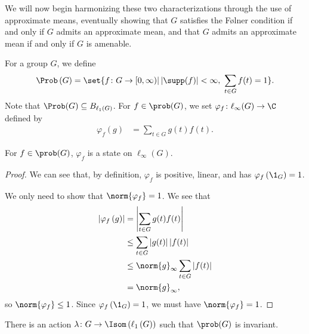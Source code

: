 We will now begin harmonizing these two characterizations through the use of approximate means, eventually showing that $G$ satisfies the Følner condition if and only if $G$ admits an approximate mean, and that $G$ admits an approximate mean if and only if $G$ is amenable.
\begin{definition}\label{def:state_on_prob_g}
  For a group $G$, we define
  \begin{align*}
    \Prob\left(G\right) = \set{f\colon G\rightarrow [0,\infty) | \left\vert \supp(f) \right\vert < \infty,~\sum_{t\in G}f(t) = 1}.
  \end{align*}
  Note that $\Prob(G) \subseteq B_{\ell_1\left(G\right)}$. For $f\in \prob(G)$, we set $\varphi_f\colon \ell_{\infty}(G)\rightarrow \C$ defined by
  \begin{align*}
    \varphi_f\left(g\right) &= \sum_{t\in G}g(t)f(t).
  \end{align*}
\end{definition}
\begin{fact}\label{fact:prob_g_state}
  For $f\in \prob(G)$, $\varphi_f$ is a state on $\ell_{\infty}\left(G\right)$.
\end{fact}
\begin{proof}
We can see that, by definition, $\varphi_f$ is positive, linear, and has $\varphi_f\left(\1_{G}\right) = 1$.\newline

We only need to show that $\norm{\varphi_f} = 1$. We see that
\begin{align*}
  \left\vert \varphi_f\left(g\right) \right\vert &= \left\vert \sum_{t\in G}g(t)f(t) \right\vert\\
                                                 &\leq \sum_{t\in G}\left\vert g(t) \right\vert\left\vert f(t) \right\vert\\
                                                 &\leq \norm{g}_{\infty}\sum_{t\in G}\left\vert f(t) \right\vert\\
                                                 &= \norm{g}_{\infty},
\end{align*}
so $\norm{\varphi_f} \leq 1$. Since $\varphi_f\left(\1_G\right) = 1$, we must have $\norm{\varphi_f} = 1$.
\end{proof}
\begin{proposition}
  There is an action $\lambda\colon G\rightarrow \Isom\left(\ell_{1}\left(G\right)\right)$ such that $\prob(G)$ is invariant.
\end{proposition}
